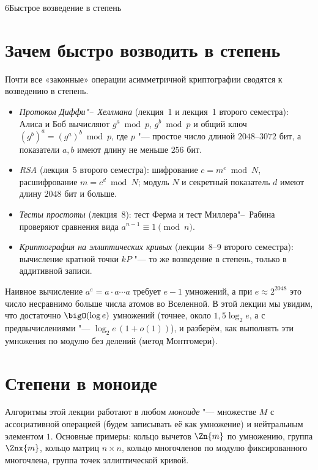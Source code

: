 \begin{lecture}{6}{Быстрое возведение в степень}

\section{Зачем быстро возводить в степень}

Почти все «законные» операции асимметричной криптографии сводятся к возведению в степень.
\begin{itemize}
  \item \emph{Протокол Диффи"--~Хеллмана} (лекция~1 и лекция~1 второго семестра): Алиса
    и Боб вычисляют $g^a \bmod p$, $g^b \bmod p$ и общий ключ $(g^b)^a = (g^a)^b \bmod p$,
    где $p$ "--- простое число длиной $2048$--$3072$ бит, а показатели $a, b$ имеют длину
    не меньше $256$ бит.
  \item \emph{RSA} (лекция~5 второго семестра): шифрование $c = m^e \bmod N$, расшифрование
    $m = c^d \bmod N$; модуль $N$ и секретный показатель $d$ имеют длину $2048$ бит и больше.
  \item \emph{Тесты простоты} (лекция~8): тест Ферма и тест Миллера"--~Рабина проверяют
    сравнения вида $a^{n-1} \equiv 1 \pmod n$.
  \item \emph{Криптография на эллиптических кривых} (лекции~8--9 второго семестра): вычисление
    кратной точки $kP$ "--- то же возведение в степень, только в аддитивной записи.
\end{itemize}
Наивное вычисление $a^e = a \cdot a \cdots a$ требует $e - 1$ умножений, а при $e \approx 2^{2048}$
это число несравнимо больше числа атомов во Вселенной. В этой лекции мы увидим, что достаточно
$\bigO(\log e)$ умножений (точнее, около $1{,}5\log_2 e$, а с предвычислениями "--- $\log_2 e\,(1 + o(1))$),
и разберём, как выполнять эти умножения по модулю без делений (метод Монтгомери).

\section{Степени в моноиде}

Алгоритмы этой лекции работают в любом \emph{моноиде} "--- множестве $M$ с ассоциативной
операцией (будем записывать её как умножение) и нейтральным элементом $1$. Основные примеры:
кольцо вычетов $\Zn{m}$ по умножению, группа $\Znx{m}$, кольцо матриц $n \times n$, кольцо
многочленов по модулю фиксированного многочлена, группа точек эллиптической кривой.


\end{lecture}
